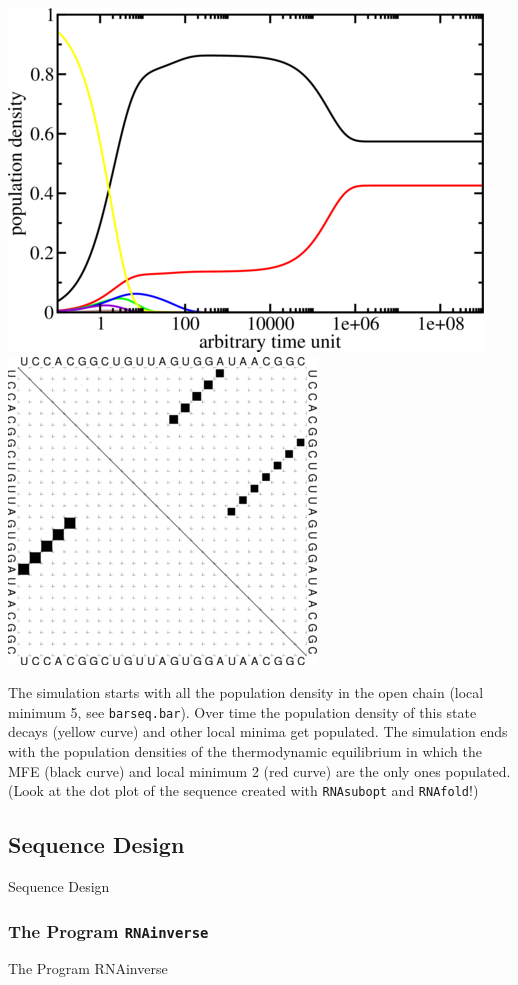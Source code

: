 \documentclass[]{article}
\begin{document}
\includegraphics{Figs/FOO.png}
\includegraphics{Figs/FOO_dp.png}

The simulation starts with all the population density in the open chain
(local minimum 5, see \texttt{barseq.bar}). Over time the population
density of this state decays (yellow curve) and other local minima get
populated. The simulation ends with the population densities of the
thermodynamic equilibrium in which the MFE (black curve) and local
minimum 2 (red curve) are the only ones populated. (Look at the dot plot
of the sequence created with \texttt{RNAsubopt} and \texttt{RNAfold}!)

\subsection{Sequence Design}{Sequence Design}\label{sequence-design}

\subsubsection{The Program \texttt{RNAinverse}}{The Program RNAinverse}\label{the-program-rnainverse}
\end{document}
